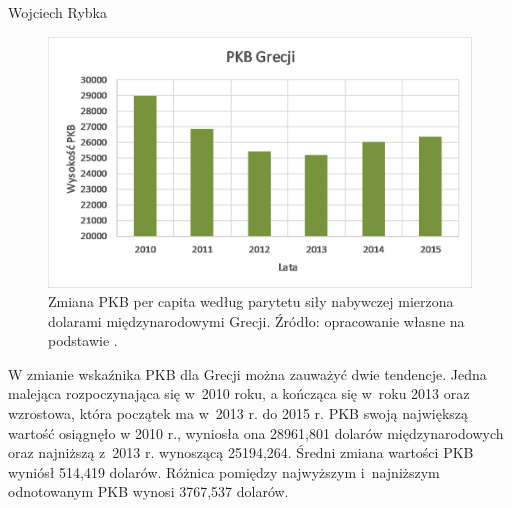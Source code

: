 \begin{artplenv}{Wojciech Rybka}
\begin{figure}[h]
	\centering
	\includegraphics[width=1\textwidth]{ART_Rybka/pkb_grecji.png} 
	\caption{Zmiana PKB per capita według parytetu siły nabywczej mierzona dolarami międzynarodowymi Grecji.
		Źródło: opracowanie własne na podstawie
		\parencite{international_monetary_fund_world_2019a}.
	}
	\label{fig4:ryb}
\end{figure}

%
%

W zmianie wskaźnika PKB dla Grecji można zauważyć dwie tendencje. Jedna malejąca rozpoczynająca się w~2010 roku,
a kończąca się w~roku 2013 oraz wzrostowa, która początek ma w~2013 r. do 2015 r. PKB swoją największą wartość osiągnęło
w 2010 r., wyniosła ona 28961,801 dolarów międzynarodowych oraz najniższą z~2013 r. wynoszącą 25194,264. Średni zmiana
wartości PKB wyniósł 514,419 dolarów. Różnica pomiędzy najwyższym i~najniższym odnotowanym PKB wynosi 3767,537 dolarów.



\end{artplenv}
